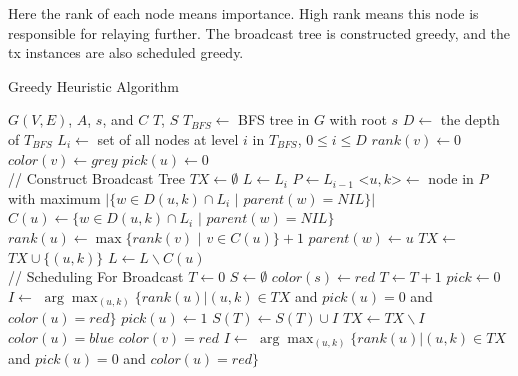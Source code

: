 \documentclass[10pt, conference]{IEEEtran}
\begin{document}
Here the rank of each node means importance. High rank means
this node is responsible for relaying further. The broadcast
tree is constructed greedy, and the tx instances are also
scheduled greedy.


\begin{algorithm}[htb]
\caption{Greedy Heuristic Algorithm}
\label{A1}
\begin{algorithmic}[1]
\REQUIRE $G(V, E)$, $A$, $s$, and $C$
\ENSURE $T$, $S$
\STATE $T_{BFS} \leftarrow $ BFS tree in $G$ with root $s$
\STATE $D \leftarrow$ the depth of $T_{BFS}$
\STATE $L_i \leftarrow$ set of all nodes at level $i$ in
$T_{BFS}$, $0 \leq i \leq D$
    \STATE $rank(v) \leftarrow 0$
    \STATE $color(v) \leftarrow grey$
    \STATE $pick(u) \leftarrow 0$
\ENDFOR\\
// Construct Broadcast Tree
\STATE $TX \leftarrow \emptyset$
    \STATE $L \leftarrow L_{i}$
    \STATE $P \leftarrow L_{i-1}$
        \STATE <$u, k$>$ \leftarrow $ node in $P$ with maximum $|\{w \in D(u, k) \cap L_i$ $|$ $parent(w) = NIL\}|$
        \STATE $C(u) \leftarrow \{w \in D(u, k) \cap L_i$ $|$ $parent(w) = NIL\}$
        \STATE $rank(u) \leftarrow \max\{rank(v)$ $|$ $v \in C(u) \}+1$
            \STATE $parent(w) \leftarrow u$
        \ENDFOR
        \STATE $TX \leftarrow$ $TX \cup \{(u, k)\}$
        \STATE $L \leftarrow L \backslash C(u)$
    \ENDWHILE
\ENDFOR \\
// Scheduling For Broadcast
\STATE $T \leftarrow 0$
\STATE $S \leftarrow \emptyset$
\STATE $color(s) \leftarrow red$
    \STATE $T \leftarrow T + 1$
    \STATE $pick \leftarrow 0$
    \STATE  $I \leftarrow $ $\arg \max_{(u,k)} \{rank(u) | (u,k) \in TX$ and $pick(u) = 0$ and $color(u) = red \}$
        \STATE $pick(u) \leftarrow 1$
        \STATE $S(T) \leftarrow S(T)\cup I$
        \STATE $TX \leftarrow TX \backslash I$
        \STATE $color(u) = blue$
            \STATE $color(v) = red$
        \ENDFOR
        \STATE $I \leftarrow $ $\arg \max_{(u,k)} \{rank(u) | (u,k) \in TX$ and $pick(u) = 0$ and $color(u) = red \}$
    \ENDWHILE
\ENDWHILE
\end{algorithmic}
\end{algorithm}
\end{document}
